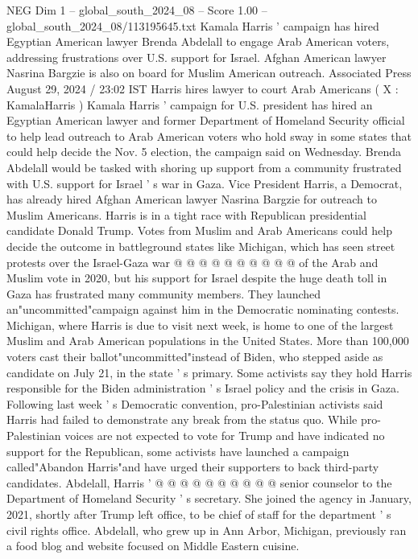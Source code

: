 \begin{textsample}{NEG Dim 1 – global\_south\_2024\_08 – Score 1.00 – global\_south\_2024\_08/113195645.txt}  \label{ex:f1_neg_443}
Kamala Harris ' campaign has hired Egyptian American lawyer Brenda Abdelall to engage Arab American voters, addressing frustrations over U.S. support for Israel.
Afghan American lawyer Nasrina Bargzie is also on board for Muslim American outreach.
Associated Press August 29, 2024 / 23:02 IST Harris hires lawyer to court Arab Americans ( X : KamalaHarris ) Kamala Harris ' campaign for U.S. president has hired an Egyptian American lawyer and former Department of Homeland Security official to help lead outreach to Arab American voters who hold sway in some states that could help decide the Nov. 5 election, the campaign said on Wednesday.
Brenda Abdelall would be tasked with shoring up support from a community frustrated with U.S. support for Israel ' s war in Gaza.
Vice President Harris, a Democrat, has already hired Afghan American lawyer Nasrina Bargzie for outreach to Muslim Americans.
Harris is in a tight race with Republican presidential candidate Donald Trump.
Votes from Muslim and Arab Americans could help decide the outcome in battleground states like Michigan, which has seen street protests over the Israel-Gaza war @ @ @ @ @ @ @ @ @ @ of the Arab and Muslim vote in 2020, but his support for Israel despite the huge death toll in Gaza has frustrated many community members.
They launched an"uncommitted"campaign against him in the Democratic nominating contests.
Michigan, where Harris is due to visit next week, is home to one of the largest Muslim and Arab American populations in the United States.
More than 100,000 voters cast their ballot"uncommitted"instead of Biden, who stepped aside as candidate on July 21, in the state ' s primary.
Some activists say they hold Harris responsible for the Biden administration ' s Israel policy and the crisis in Gaza.
Following last week ' s Democratic convention, pro-Palestinian activists said Harris had failed to demonstrate any break from the status quo.
While pro-Palestinian voices are not expected to vote for Trump and have indicated no support for the Republican, some activists have launched a campaign called"Abandon Harris"and have urged their supporters to back third-party candidates.
Abdelall, Harris ' @ @ @ @ @ @ @ @ @ @ senior counselor to the Department of Homeland Security ' s secretary.
She joined the agency in January, 2021, shortly after Trump left office, to be chief of staff for the department ' s civil rights office.
Abdelall, who grew up in Ann Arbor, Michigan, previously ran a food blog and website focused on Middle Eastern cuisine.

\end{textsample}
